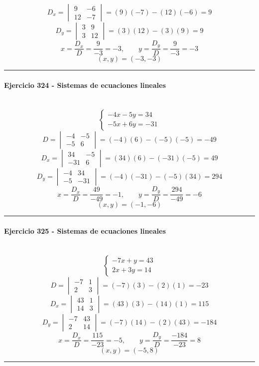 \documentclass[10pt,a4paper]{article}
\newcommand{\res}[1]{\paragraph{#1}\mbox{}\\[-1.2em]}
\begin{document}
\[ D_x=\begin{vmatrix}9&-6\\12&-7\end{vmatrix}=(9)(-7)-(12)(-6)=9 \]
\[ D_y=\begin{vmatrix}3&9\\3&12\end{vmatrix}=(3)(12)-(3)(9)=9 \]
\[ x=\frac{D_x}{D}=\frac{9}{-3}=-3,\qquad y=\frac{D_y}{D}=\frac{9}{-3}=-3 \]
\[ \boxed{(x,y)=(-3,-3)} \]
\vspace{1mm}\hrule\vspace{2mm}
\res{Ejercicio 324 - Sistemas de ecuaciones lineales}
\[ \begin{cases}- 4 x - 5 y=34\\- 5 x + 6 y=-31\end{cases} \]
\[ D=\begin{vmatrix}-4&-5\\-5&6\end{vmatrix}=(-4)(6)-(-5)(-5)=-49 \]
\[ D_x=\begin{vmatrix}34&-5\\-31&6\end{vmatrix}=(34)(6)-(-31)(-5)=49 \]
\[ D_y=\begin{vmatrix}-4&34\\-5&-31\end{vmatrix}=(-4)(-31)-(-5)(34)=294 \]
\[ x=\frac{D_x}{D}=\frac{49}{-49}=-1,\qquad y=\frac{D_y}{D}=\frac{294}{-49}=-6 \]
\[ \boxed{(x,y)=(-1,-6)} \]
\vspace{1mm}\hrule\vspace{2mm}
\res{Ejercicio 325 - Sistemas de ecuaciones lineales}
\[ \begin{cases}- 7 x + y=43\\2 x + 3 y=14\end{cases} \]
\[ D=\begin{vmatrix}-7&1\\2&3\end{vmatrix}=(-7)(3)-(2)(1)=-23 \]
\[ D_x=\begin{vmatrix}43&1\\14&3\end{vmatrix}=(43)(3)-(14)(1)=115 \]
\[ D_y=\begin{vmatrix}-7&43\\2&14\end{vmatrix}=(-7)(14)-(2)(43)=-184 \]
\[ x=\frac{D_x}{D}=\frac{115}{-23}=-5,\qquad y=\frac{D_y}{D}=\frac{-184}{-23}=8 \]
\[ \boxed{(x,y)=(-5,8)} \]
\vspace{1mm}\hrule\vspace{2mm}
\end{document}
